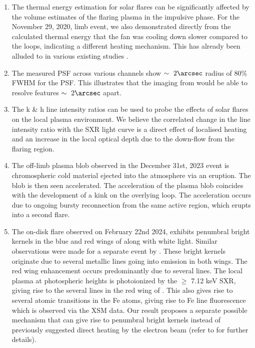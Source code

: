 \begin{enumerate}
    \item The thermal energy estimation for solar flares can be significantly affected by the volume estimates of the flaring plasma in the impulsive phase. For the November 29, 2020, limb event, we also demonstrated directly from the calculated thermal energy that the fan was cooling down slower compared to the loops, indicating a different heating mechanism. This has already been alluded to in various existing studies \citep[e.g.,][]{xie23,reeves19,longcope11}.

    \item The measured PSF across various channels show $\sim~2\arcsec$ radius of 80\% FWHM for the PSF. This illustrates that the imaging from {\suit} would be able to resolve features $\sim~2\arcsec$ apart. 
    
    \item The  k \& h line intensity ratios can be used to probe the effects of solar flares on the local plasma environment. We believe the correlated change in the line intensity ratio with the SXR light curve is a direct effect of localised heating and an increase in the local optical depth due to the down-flow from the flaring region.

    \item The off-limb plasma blob observed in the December 31st, 2023 event is chromospheric cold material ejected into the atmosphere via an eruption. The blob is then seen accelerated. The acceleration of the plasma blob coincides with the development of a kink on the overlying loop. The acceleration occurs due to ongoing bursty reconnection from the same active region, which erupts into a second flare.

    \item The on-disk flare observed on February 22nd 2024, exhibits penumbral bright kernels in the blue and red wings of  along with white light. Similar observations were made for a separate event by \cite{kowalski19}. These bright kernels originate due to several metallic lines going into emission in both wings. The red wing enhancement occurs predominantly due to several  lines. The local plasma at photospheric heights is photoionized by the $\ge$ 7.12 keV SXR, giving rise to the several  lines in the red wing of . This also gives rise to several atomic transitions in the Fe atoms, giving rise to Fe line fluorescence which is observed via the XSM data. Our result proposes a separate possible mechanism that can give rise to penumbral bright kernels instead of previously suggested direct heating by the electron beam (refer to \cite{kowalski19} for further details). 
    
\end{enumerate}  

